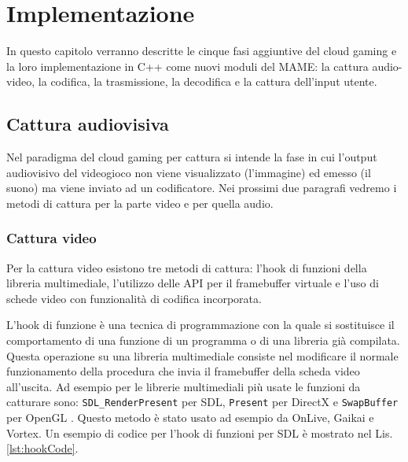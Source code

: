 %
%
\chapter{Implementazione}
In questo capitolo verranno descritte le cinque fasi aggiuntive del cloud gaming e la loro implementazione in C++ come nuovi moduli del MAME: la cattura audio-video, la codifica, la trasmissione, la decodifica e la cattura dell'input utente.




\section{Cattura audiovisiva}
Nel paradigma del cloud gaming per cattura si intende la fase in cui l'output audiovisivo del videogioco non viene visualizzato (l'immagine) ed emesso (il suono) ma viene inviato ad un codificatore. Nei prossimi due paragrafi vedremo i metodi di cattura per la parte video e per quella audio.


\subsection{Cattura video} \label{subsec:cap3_Video}
Per la cattura video esistono tre metodi di cattura: l'hook di funzioni della libreria multimediale, l'utilizzo delle API per il framebuffer virtuale e l'uso di schede video con funzionalità di codifica incorporata.

L'hook di funzione è una tecnica di programmazione con la quale si sostituisce il comportamento di una funzione di un programma o di una libreria già compilata. Questa operazione su una libreria multimediale consiste nel modificare il normale funzionamento della procedura che invia il framebuffer della scheda video all'uscita. Ad esempio per le librerie multimediali più usate le funzioni da catturare sono: \verb|SDL_RenderPresent| per SDL, \verb|Present| per DirectX e \verb|SwapBuffer| per OpenGL \parencite{GamingAnywhere}. Questo metodo è stato usato ad esempio da OnLive, Gaikai e Vortex. Un esempio di codice per l'hook di funzioni per SDL è mostrato nel Lis. \ref{lst:hookCode}.

